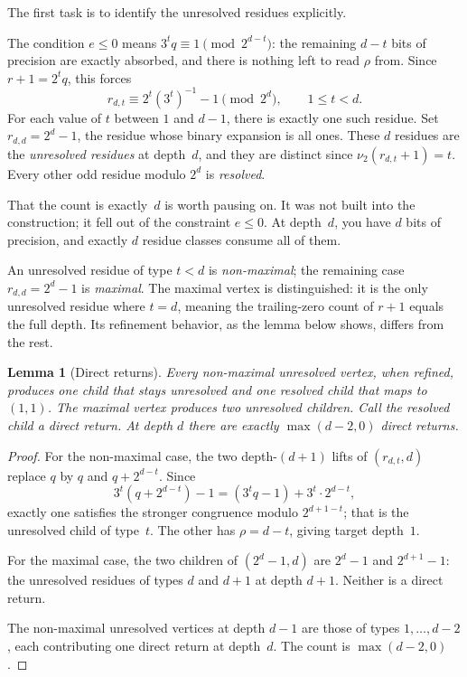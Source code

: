 \documentclass[11pt]{amsart}
\newtheorem{lemma}[theorem]{Lemma}
\theoremstyle{definition}
\theoremstyle{remark}
\newcommand{\nuu}{\nu_2}
\begin{document}
The first task is to identify the unresolved residues explicitly.

The condition $e\le0$ means $3^tq\equiv1\pmod{2^{d-t}}$: the
remaining $d-t$ bits of precision are exactly absorbed, and there is
nothing left to read $\rho$ from.  Since $r+1=2^tq$, this forces
\[
r_{d,t}\equiv 2^t(3^t)^{-1}-1\pmod{2^d},
\qquad 1\le t<d.
\]
For each value of $t$ between $1$ and $d-1$, there is exactly one such residue.  Set $r_{d,d}=2^d-1$, the residue whose binary expansion is all ones.  These $d$ residues are the \emph{unresolved residues} at depth~$d$, and they are distinct since
$\nuu(r_{d,t}+1)=t$.  Every other odd residue modulo $2^d$ is \emph{resolved}.

That the count is exactly~$d$ is worth pausing on.  It was not built into the construction; it fell out of the constraint $e\le0$.  At depth~$d$, you have $d$ bits of precision, and exactly $d$ residue classes consume all of them.

An unresolved residue of type $t<d$ is \emph{non-maximal}; the
remaining case $r_{d,d}=2^d-1$ is \emph{maximal}.  The maximal vertex is distinguished: it is the only unresolved residue where $t=d$, meaning the trailing-zero count of $r+1$ equals the full depth.  Its refinement behavior, as the lemma below shows, differs from the rest.

\begin{lemma}[Direct returns]\label{lem:directreturns}
Every non-maximal unresolved vertex, when refined, produces one child
that stays unresolved and one resolved child that maps to $(1,1)$.
The maximal vertex produces two unresolved children.
Call the resolved child a \emph{direct return}.  At depth $d$ there are
exactly $\max(d-2,0)$ direct returns.
\end{lemma}

\begin{proof}
For the non-maximal case, the two depth-$(d+1)$ lifts of
$(r_{d,t},d)$ replace $q$ by $q$ and $q+2^{d-t}$.  Since
\[
3^t(q+2^{d-t})-1=(3^tq-1)+3^t\cdot 2^{d-t},
\]
exactly one satisfies the stronger congruence modulo $2^{d+1-t}$;
that is the unresolved child of type~$t$.  The other has $\rho=d-t$,
giving target depth~$1$.

For the maximal case, the two children of $(2^d-1,d)$ are $2^d-1$ and
$2^{d+1}-1$: the unresolved residues of types $d$ and $d+1$ at
depth $d+1$.  Neither is a direct return.

The non-maximal unresolved vertices at depth $d-1$ are those of types
$1,\ldots,d-2$, each contributing one direct return at depth~$d$.
The count is $\max(d-2,0)$.
\end{proof}
\end{document}
